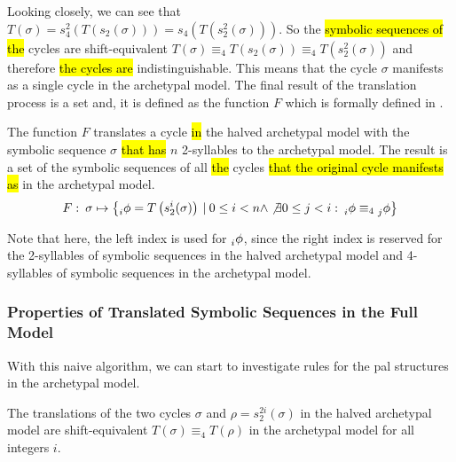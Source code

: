 Looking closely, we can see that $T(\sigma) = s_4^2\left(T\left(s_2(\sigma)\right)\right) = s_4\left(T\left(s_2^2(\sigma)\right)\right)$.
So the \hl{symbolic sequences of the} cycles are shift-equivalent $T(\sigma) \equiv_4 T\left(s_2(\sigma)\right) \equiv_4 T\left(s_2^2(\sigma)\right)$ and therefore \hl{the cycles are} indistinguishable.
This means that the cycle $\sigma$ manifests as a single cycle in the archetypal model.
The final result of the translation process is a set and, it is defined as the function $F$ which is formally defined in .

\begin{definition}
	\label{def:F}
	The function $F$ translates a cycle \hl{in} the halved archetypal model with the symbolic sequence $\sigma$ \hl{that has} $n$ 2-syllables to the archetypal model.
	The result is a set of the symbolic sequences of all \hl{the} cycles \hl{that the original cycle manifests as} in the archetypal model.
	\begin{align}
		F:\: \sigma \mapsto \left\{
		\prescript{}{i}{\phi} = T\left(s_2^i(\sigma)\right) \:|\:
		0 \leq i < n \land
		\not\exists 0 \leq j < i:\: \prescript{}{i}{\phi} \equiv_4 \prescript{}{j}{\phi}
		\right\}
	\end{align}
\end{definition}

Note that here, the left index is used for $\prescript{}{i}{\phi}$, since the right index is reserved for the 2-syllables of symbolic sequences in the halved archetypal model and 4-syllables of symbolic sequences in the archetypal model.

\subsubsection{Properties of Translated Symbolic Sequences in the Full Model}

With this naive algorithm, we can start to investigate rules for the \gls{pal} structures in the archetypal model.

\begin{lemma}
	\label{lemma:equivalence.translations}
	The translations of the two cycles $\sigma$ and $\rho = s_2^{2i}(\sigma)$ in the halved archetypal model are shift-equivalent $T(\sigma) \equiv_4 T(\rho)$ in the archetypal model for all integers $i$.
\end{lemma}

